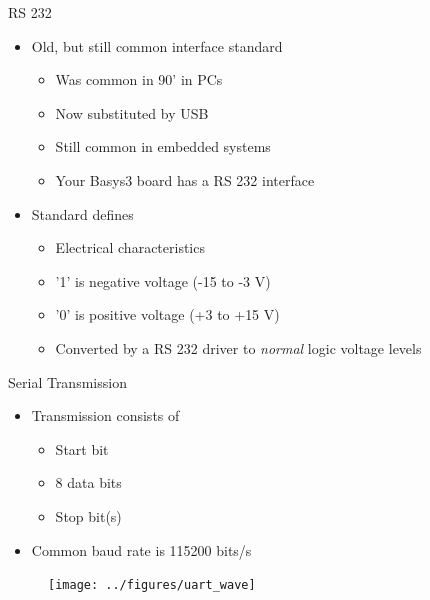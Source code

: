 \begin{frame}[fragile]{RS 232}
\begin{itemize}
\item Old, but still common interface standard
\begin{itemize}
\item Was common in 90' in PCs
\item Now substituted by USB
\item Still common in embedded systems
\item Your Basys3 board has a RS 232 interface
\end{itemize}
\item Standard defines
\begin{itemize}
\item Electrical characteristics
\item '1' is negative voltage (-15 to -3 V)
\item '0' is positive voltage (+3 to +15 V)
\item Converted by a RS 232 driver to \emph{normal} logic voltage levels
\end{itemize}
\end{itemize}
\end{frame}


\begin{frame}[fragile]{Serial Transmission}
\begin{itemize}
\item Transmission consists of
\begin{itemize}
\item Start bit
\item 8 data bits
\item Stop bit(s)
\end{itemize}
\item Common baud rate is 115200 bits/s
\end{itemize}
\begin{figure}
  \texttt{[image: ../figures/uart\_wave]}
\end{figure}
\end{frame}


